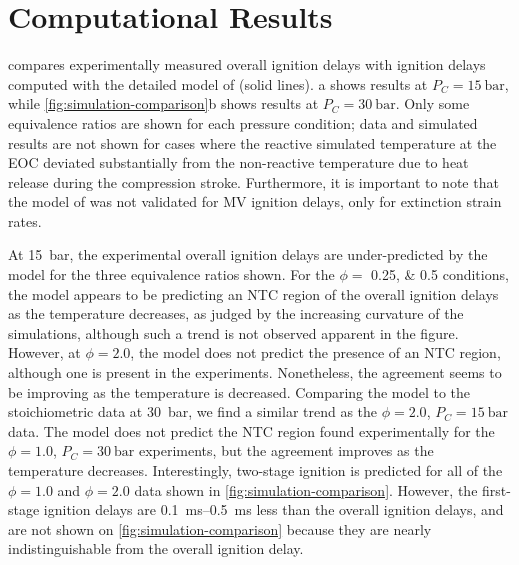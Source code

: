 \documentclass[letterpaper, review, sort&compress]{elsarticle}
\begin{document}
\section{Computational Results}\label{sec:computational-results}

 compares experimentally measured overall ignition delays with
ignition delays computed with the detailed model of \citet{Dievart2013} (solid lines).
a shows results at \(P_C = \SI{15}{\bar}\), while
\cref{fig:simulation-comparison}b shows results at \(P_C = \SI{30}{\bar}\). Only some equivalence
ratios are shown for each pressure condition; data and simulated results are not shown for cases
where the reactive simulated temperature at the EOC deviated substantially from the non-reactive
temperature due to heat release during the compression stroke. Furthermore, it is important to note
that the model of \citet{Dievart2013} was not validated for MV ignition delays, only for extinction
strain rates.

\begin{center}
    \captionsetup{type=figure}
    \resizebox{\textwidth}{!}{}
    \caption{Comparison of experimental (\(\tau\) and \(\tau_1\)) and simulated (\(\tau\)) ignition
    delays computed using the procedure described in \cref{sec:experimental-modeling}. a)
    \SI{15}{\bar}, b) \SI{30}{\bar}.}
    \label{fig:simulation-comparison}
\end{center}

At \SI{15}{\bar}, the experimental overall ignition delays are under-predicted by the
\citet{Dievart2013} model for the three equivalence ratios shown. For the \(\phi =\)
\numlist{0.25;0.5} conditions, the model appears to be predicting an NTC region of the overall
ignition delays as the temperature decreases, as judged by the increasing curvature of the
simulations, although such a trend is not observed apparent in the figure. However, at \(\phi =
2.0\), the model does not predict the presence of an NTC region, although one is present in the
experiments. Nonetheless, the agreement seems to be improving as the temperature is decreased.
Comparing the \citet{Dievart2013} model to the stoichiometric data at \SI{30}{\bar}, we find a
similar trend as the \(\phi=2.0\), \(P_C=\SI{15}{\bar}\) data. The model does not predict the NTC
region found experimentally for the \(\phi = 1.0\), \(P_C=\SI{30}{\bar}\) experiments, but the
agreement improves as the temperature decreases. Interestingly, two-stage ignition is predicted for
all of the \(\phi=1.0\) and \(\phi=2.0\) data shown in \cref{fig:simulation-comparison}. However,
the first-stage ignition delays are \SIrange{0.1}{0.5}{\ms} less than the overall ignition delays,
and are not shown on \cref{fig:simulation-comparison} because they are nearly indistinguishable from
the overall ignition delay.
\end{document}
